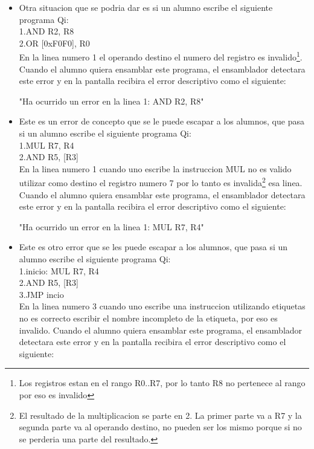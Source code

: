 \begin{itemize}
\item Otra situacion que se podria dar es si un alumno escribe el siguiente programa Qi:\\

1.AND R2, R8 \\
2.OR [0xF0F0], R0 \\

En la linea numero 1 el operando destino el numero del registro es invalido\footnote{Los registros estan en el rango R0..R7, por lo tanto R8 no pertenece al rango por eso es invalido}. Cuando el alumno quiera ensamblar este programa, el ensamblador detectara este error y en la pantalla recibira el error descriptivo como el siguiente:

"Ha ocurrido un error en la linea 1: AND R2, R8" \\ 

\item Este es un error de concepto que se le puede escapar a los alumnos, que pasa si un alumno escribe el siguiente programa Qi:\\

1.MUL R7, R4 \\
2.AND R5, [R3] \\

En la linea numero 1 cuando uno escribe la instruccion MUL no es valido utilizar como destino el registro numero 7 por lo tanto es invalida\footnote{El resultado de la multiplicacion se parte en 2. La primer parte va a R7 y la segunda parte va al operando destino, no pueden ser los mismo porque si no se perderia una parte del resultado.} esa linea. Cuando el alumno quiera ensamblar este programa, el ensamblador detectara este error y en la pantalla recibira el error descriptivo como el siguiente:

"Ha ocurrido un error en la linea 1: MUL R7, R4" \\ 

\item Este es otro error que se les puede escapar a los alumnos, que pasa si un alumno escribe el siguiente programa Qi:\\

1.inicio: MUL R7, R4 \\
2.AND R5, [R3] \\
3.JMP incio \\

En la linea numero 3 cuando uno escribe una instruccion utilizando etiquetas no es correcto escribir el nombre incompleto de la etiqueta, por eso es invalido. Cuando el alumno quiera ensamblar este programa, el ensamblador detectara este error y en la pantalla recibira el error descriptivo como el siguiente:


\end{itemize}
